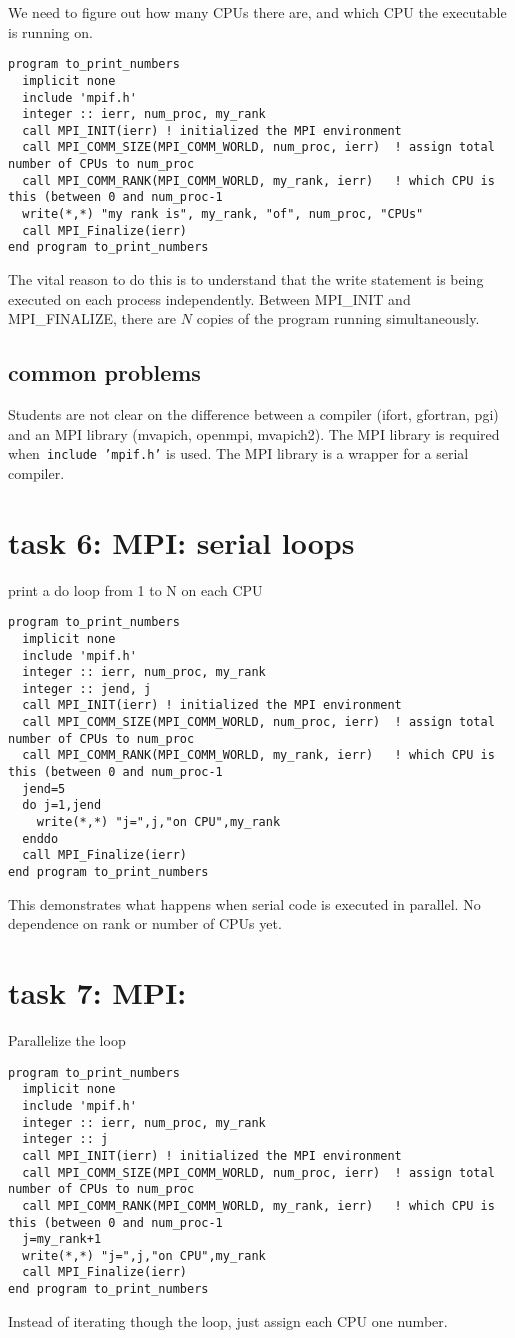 \documentclass[12pt]{report}
\begin{document}
We need to figure out how many CPUs there are, and which CPU the executable is running on.
\begin{verbatim}
program to_print_numbers
  implicit none
  include 'mpif.h'
  integer :: ierr, num_proc, my_rank  
  call MPI_INIT(ierr) ! initialized the MPI environment
  call MPI_COMM_SIZE(MPI_COMM_WORLD, num_proc, ierr)  ! assign total number of CPUs to num_proc
  call MPI_COMM_RANK(MPI_COMM_WORLD, my_rank, ierr)   ! which CPU is this (between 0 and num_proc-1
  write(*,*) "my rank is", my_rank, "of", num_proc, "CPUs"
  call MPI_Finalize(ierr)
end program to_print_numbers   
\end{verbatim}
The vital reason to do this is to understand that the write statement is being executed on each process independently. Between MPI\_INIT and MPI\_FINALIZE, there are $N$ copies of the program running simultaneously.

\subsection{common problems}
Students are not clear on the difference between a compiler (ifort, gfortran, pgi) and an MPI library (mvapich, openmpi, mvapich2). The MPI library is required when~\texttt{include~'mpif.h'} is used. The MPI library is a wrapper for a serial compiler.

\section{task 6: MPI: serial loops}
print a do loop from 1 to N on each CPU
\begin{verbatim}
program to_print_numbers
  implicit none
  include 'mpif.h'
  integer :: ierr, num_proc, my_rank  
  integer :: jend, j
  call MPI_INIT(ierr) ! initialized the MPI environment
  call MPI_COMM_SIZE(MPI_COMM_WORLD, num_proc, ierr)  ! assign total number of CPUs to num_proc
  call MPI_COMM_RANK(MPI_COMM_WORLD, my_rank, ierr)   ! which CPU is this (between 0 and num_proc-1
  jend=5
  do j=1,jend
    write(*,*) "j=",j,"on CPU",my_rank
  enddo        
  call MPI_Finalize(ierr)
end program to_print_numbers   
\end{verbatim}
This demonstrates what happens when serial code is executed in parallel. No dependence on rank or number of CPUs yet.

\section{task 7: MPI: }
Parallelize the loop
\begin{verbatim}
program to_print_numbers
  implicit none
  include 'mpif.h'
  integer :: ierr, num_proc, my_rank  
  integer :: j
  call MPI_INIT(ierr) ! initialized the MPI environment
  call MPI_COMM_SIZE(MPI_COMM_WORLD, num_proc, ierr)  ! assign total number of CPUs to num_proc
  call MPI_COMM_RANK(MPI_COMM_WORLD, my_rank, ierr)   ! which CPU is this (between 0 and num_proc-1
  j=my_rank+1
  write(*,*) "j=",j,"on CPU",my_rank
  call MPI_Finalize(ierr)
end program to_print_numbers   
\end{verbatim}
Instead of iterating though the loop, just assign each CPU one number.
\end{document}

